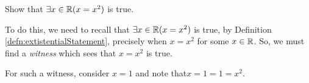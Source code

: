\guard



\begin{exmp}
\label{exmp:existentialStatementOverReals}
	Show that $\exists x\in \mathbb{R}(x = x^2)$ is true.

	To do this, we need to recall that $\exists x\in \mathbb{R}(x = x^2)$ is true, by Definition \ref{defn:extistentialStatement}, precisely when $x= x^2$ for some $x\in \mathbb{R}$.
	So, we must find a \emph{witness} which sees that $x=x^2$ is true.

	For such a witness, consider $x=1$ and note that$x=1=1=x^2$.
\end{exmp}
